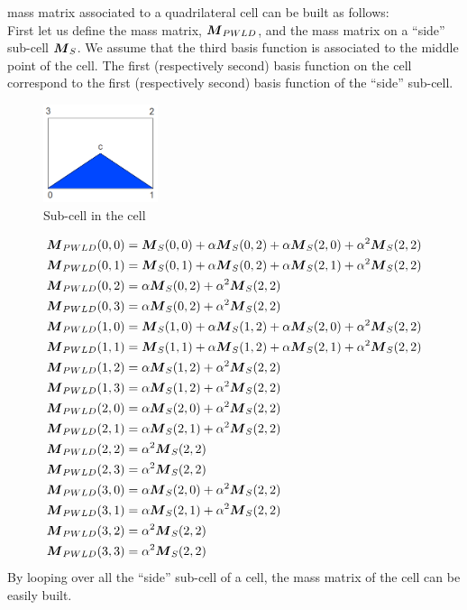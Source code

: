 mass matrix associated to a quadrilateral cell can be built as follows:\\
First let us define the mass matrix, $\boldsymbol{M}_{PWLD}$, and the mass matrix on a 
``side'' sub-cell $\boldsymbol{M}_S$. We assume that the third basis function is associated 
to the middle point of the cell. The first (respectively second) basis function on 
the cell correspond to the first (respectively second) basis function of the 
``side'' sub-cell.
\begin{figure}[H]
  \centering
  \includegraphics[width=0.3\textwidth]{./Dsa/mass_matrix}
  \caption{Sub-cell in the cell}
\end{figure}
{\allowdisplaybreaks
\begin{align}
  & \boldsymbol{M}_{PWLD}(0,0) =  \boldsymbol{M}_S(0,0) + \alpha \boldsymbol{M}_S(0,2) + \alpha
  \boldsymbol{M}_S(2,0) + \alpha^2 \boldsymbol{M}_S(2,2)\\
  & \boldsymbol{M}_{PWLD}(0,1) =  \boldsymbol{M}_S(0,1) + \alpha \boldsymbol{M}_S(0,2) + \alpha
  \boldsymbol{M}_S(2,1) + \alpha^2 \boldsymbol{M}_S(2,2)\\
  & \boldsymbol{M}_{PWLD}(0,2) =  \alpha \boldsymbol{M}_S(0,2) + \alpha^2 \boldsymbol{M}_S(2,2)\\
  & \boldsymbol{M}_{PWLD}(0,3) =  \alpha \boldsymbol{M}_S(0,2) + \alpha^2 \boldsymbol{M}_S(2,2)\\
  & \boldsymbol{M}_{PWLD}(1,0) =  \boldsymbol{M}_S(1,0) + \alpha \boldsymbol{M}_S(1,2) + \alpha
  \boldsymbol{M}_S(2,0) + \alpha^2 \boldsymbol{M}_S(2,2)\\
  & \boldsymbol{M}_{PWLD}(1,1) =  \boldsymbol{M}_S(1,1) + \alpha \boldsymbol{M}_S(1,2) + \alpha
  \boldsymbol{M}_S(2,1) + \alpha^2 \boldsymbol{M}_S(2,2)\\
  & \boldsymbol{M}_{PWLD}(1,2) =  \alpha \boldsymbol{M}_S(1,2) + \alpha^2 \boldsymbol{M}_S(2,2)\\
  & \boldsymbol{M}_{PWLD}(1,3) =  \alpha \boldsymbol{M}_S(1,2) + \alpha^2 \boldsymbol{M}_S(2,2)\\
  & \boldsymbol{M}_{PWLD}(2,0) =  \alpha \boldsymbol{M}_S(2,0) + \alpha^2 \boldsymbol{M}_S(2,2)\\
  & \boldsymbol{M}_{PWLD}(2,1) =  \alpha \boldsymbol{M}_S(2,1) + \alpha^2 \boldsymbol{M}_S(2,2)\\
  & \boldsymbol{M}_{PWLD}(2,2) =  \alpha^2 \boldsymbol{M}_S(2,2)\\
  & \boldsymbol{M}_{PWLD}(2,3) =  \alpha^2 \boldsymbol{M}_S(2,2)\\
  & \boldsymbol{M}_{PWLD}(3,0) =  \alpha \boldsymbol{M}_S(2,0) + \alpha^2 \boldsymbol{M}_S(2,2)\\
  & \boldsymbol{M}_{PWLD}(3,1) =  \alpha \boldsymbol{M}_S(2,1) + \alpha^2 \boldsymbol{M}_S(2,2)\\
  & \boldsymbol{M}_{PWLD}(3,2) =  \alpha^2 \boldsymbol{M}_S(2,2)\\
  & \boldsymbol{M}_{PWLD}(3,3) =  \alpha^2 \boldsymbol{M}_S(2,2)
\end{align}}    
By looping over all the ``side'' sub-cell of a cell, the mass matrix of the 
cell can be easily built.
